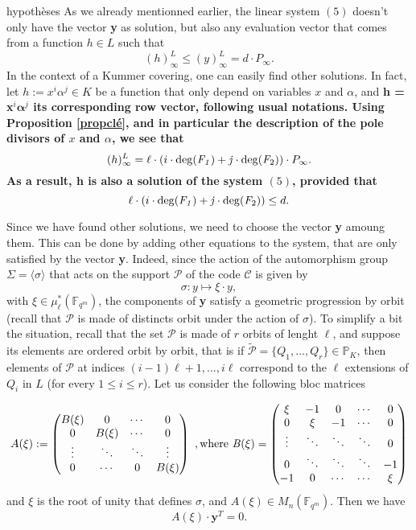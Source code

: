\documentclass[10pt]{article}
\newcommand{\s}{\vspace{0.3cm}}
\newcommand{\cd}{\cdot}
\newcommand{\fqm}{\mathbb{F}_{q^m}}
\newcommand{\PR}{\mathcal{P}}
\begin{document}
\s
hypothèses
As we already mentionned earlier, the linear system $(5)$ doesn't only have the vector \textbf{y} as solution, but also any evaluation vector that comes from a function $h \in L$ such that 
\[(h)^L_{\infty} \leq (y)^L_{\infty} = d \cd P_{\infty}.\]
In the context of a Kummer covering, one can easily find other solutions. In fact, let $h := x^i\alpha^j \in K$ be a function that only depend on variables $x$ and $\alpha$, and \bf{h} \rm = \textbf{x}$^i\boldsymbol{\alpha}^j$ \rm its corresponding row vector, following usual notations. Using Proposition \ref{propclé}, and in particular the description of the pole divisors of $x$ and $\alpha$, we see that 
\[ (h)^L_{\infty} = \ell \cd \left(i \cd \rm{deg}\it(F_1)+j \cd \rm{deg}\it(F_{\rm 2})\right) \cd P_{\infty}.\]
As a result, \bf{h} \rm is also a solution of the system $(5)$, provided that
\[\ell \cd \left(i \cd \rm{deg}\it(F_1)+j \cd \rm{deg}\it(F_{\rm 2})\right) \leq d.\]


\s

Since we have found other solutions, we need to choose the vector \textbf{y} amoung them. This can be done by adding other equations to the system, that are only satisfied by the vector \textbf{y}. Indeed, since the action of the automorphism group $\Sigma = \langle\sigma\rangle$ that acts on the support $\PR$ of the code $\mathcal{C}$ is given by 
\[\sigma : y \longmapsto \xi \cd y,\]
with $\xi \in \mu^*_{\ell}(\fqm)$, the components of \textbf{y} satisfy a geometric progression by orbit (recall that $\PR$ is made of distincts orbit under the action of $\sigma$). To simplify a bit the situation, recall that the set $\PR$ is made of $r$ orbits of lenght $\ell$, and suppose its elements are ordered orbit by orbit, that is if $\tilde{\PR} = \{Q_1,...,Q_r\} \in \mathbb{P}_K$, then elements of $\PR$ at indices $(i-1)\ell+1,...,i\ell$ correspond to the $\ell$ extensions of $Q_{i}$ in $L$ (for every $1\leq i \leq r$). Let us consider the following bloc matrices

\begin{equation*} 
A(\xi) := 
\begin{pmatrix}
B(\xi) & 0 & \cdots & 0 \\
0 & B(\xi) & \cdots & 0 \\
\vdots & \ddots & \ddots & \vdots \\
0 & \cdots & 0 & B(\xi)
\end{pmatrix} \ , \rm where \it \ 
B(\xi) = 
\begin{pmatrix}
\xi & -1 & 0 & \cdots & 0 \\
0 & \xi & -1 & \cdots & 0 \\
\vdots & \ddots & \ddots & \ddots & 0 \\
0 & \ddots & \ddots & \ddots & -1 \\
-1 & 0 & \cdots & \cdots & \xi
\end{pmatrix}
\end{equation*}
and $\xi$ is the root of unity that defines $\sigma$, and $A(\xi) \in M_{n}(\fqm)$. Then we have
\begin{equation*}
A(\xi) \cd \textbf{y}^T
= 0.
\end{equation*}
\end{document}
